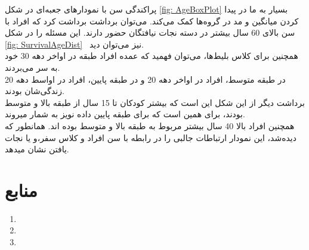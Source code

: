 \documentclass{article}
\begin{document}
	  پراکندگی سن با نمودارهای جعبه‌ای در شکل 
	  \ref{fig: AgeBoxPlot}
	  بسیار به ما در پیدا کردن میانگین و مد در گروه‌ها کمک می‌کند.
	  می‌توان برداشت برداشت کرد که افراد با سن بالای 60 سال بیشتر در دسته نجات نیافتگان حضور دارند. این مسئله را در شکل
	  \ref{fig: SurvivalAgeDist}
	  ~نیز می‌توان دید.\\
	  همچنین برای کلاس بلیط‌ها، می‌توان فهمید که عمده افراد طبقه 
	  در اواخر دهه 30 خود به سر می‌بردند.\\
	  در طبقه متوسط، افراد در اواخر دهه 20 و در طبقه پایین، افراد در اواسط دهه 20 زندگی‌شان بودند.\\
	  برداشت دیگر از این شکل این است که بیشتر کودکان تا 15 سال از طبقه بالا و متوسط بودند، برای همین است که برای طبقه پایین داده نویز به شمار میروند.\\
	  همچنین افراد بالا 40 سال بیشتر مربوط به طبقه بالا و متوسط بوده اند. همانطور که دیده‌شد، این نمودار ارتباطات جالبی را در رابطه با سن افراد و کلاس سفر،‌و یا نجات یافتن نشان میدهد.
	  
	  \section*{منابع}
	  
	 \begin{enumerate}
	 	\item {}
	 	\item {}
	 	\item {}
	 \end{enumerate}
\end{document}
